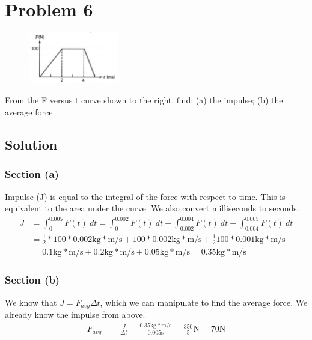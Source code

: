 \documentclass[12pt]{article}
\begin{document}
\pagebreak
\section*{Problem 6}
\begin{figure}
    \vspace{-58pt}
    \includegraphics[width=0.35\textwidth]{graph_6.png} 
\end{figure}
From the F versus t curve shown to the right, find: (a) the impulse; (b) the average force.

\subsection*{Solution}
\subsubsection*{Section (a)}
Impulse (J) is equal to the integral of the force with respect to time. This is equivalent to the area under the curve. We also convert milliseconds to seconds.
\begin{align*}
    J   &=  \int_{0}^{0.005} F(t)\ dt
        =   \int_{0}^{0.002} F(t)\ dt + \int_{0.002}^{0.004} F(t)\ dt + \int_{0.004}^{0.005} F(t)\ dt\\
        &=  \frac{1}{2}*100*0.002 \unit{\kilo\gram*\meter/\second} + 100*0.002 \unit{\kilo\gram*\meter/\second} + \frac{1}{2}100*0.001 \unit{\kilo\gram*\meter/\second}\\
        &=  0.1 \unit{\kilo\gram*\meter/\second} + 0.2 \unit{\kilo\gram*\meter/\second} + 0.05 \unit{\kilo\gram*\meter/\second}
        =   \boxed{0.35 \unit{\kilo\gram*\meter/\second}}
\end{align*}

\subsubsection*{Section (b)}
We know that \( J = F_{avg}\Delta t \), which we can manipulate to find the average force. We already know the impulse from above.
\begin{align*}
    F_{avg} &=  \frac{J}{\Delta t}
        =   \frac{0.35 \unit{\kilo\gram*\meter/\second}}{0.005 \unit{\second}}
        =   \frac{350}{5}\unit{\newton}
        =   \boxed{ 70\unit{\newton} }
\end{align*}
\end{document}
